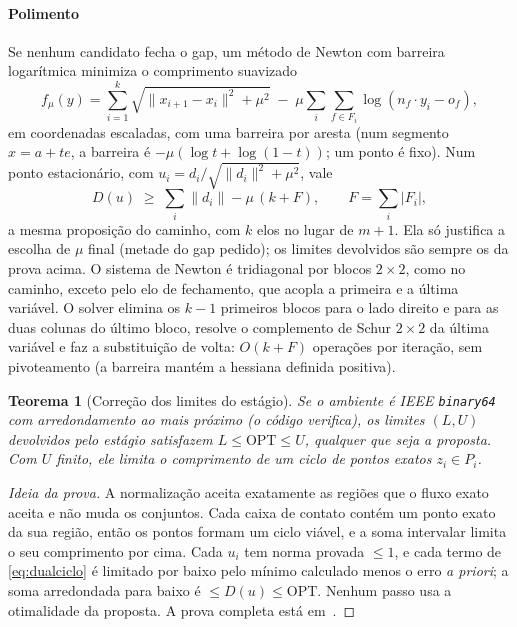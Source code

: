 \documentclass[11pt,a4paper]{article}
\theoremstyle{plain}\newtheorem{proposicao}{Proposição}
\theoremstyle{definition}\newtheorem{definicao}{Definição}
\theoremstyle{plain}\newtheorem{teorema}{Teorema}
\theoremstyle{plain}\newtheorem{lema}{Lema}
\newcommand{\norm}[1]{\lVert#1\rVert}
\newcommand{\abs}[1]{\lvert#1\rvert}
\newcommand{\OPT}{\mathrm{OPT}}
\begin{document}
\paragraph{Polimento} Se nenhum candidato fecha o gap, um método de Newton com barreira logarítmica minimiza o comprimento suavizado
\[
f_\mu(y)=\sum_{i=1}^k\sqrt{\norm{x_{i+1}-x_i}^2+\mu^2}\;-\;\mu\sum_i\sum_{f\in F_i}\log(n_f\cdot y_i-o_f),
\]
em coordenadas escaladas, com uma barreira por aresta (num segmento \(x=a+te\), a barreira é \(-\mu(\log t+\log(1-t))\); um ponto é fixo). Num ponto estacionário, com \(u_i=d_i/\sqrt{\norm{d_i}^2+\mu^2}\), vale
\begin{equation}\label{eq:perdabarreira}
D(u)\;\ge\;\sum_i\norm{d_i}-\mu\,(k+F),\qquad F=\textstyle\sum_i\abs{F_i},
\end{equation}
a mesma proposição do caminho, com \(k\) elos no lugar de \(m+1\). Ela só justifica a escolha de \(\mu\) final (metade do gap pedido); os limites devolvidos são sempre os da prova acima. O sistema de Newton é tridiagonal por blocos \(2\times2\), como no caminho, exceto pelo elo de fechamento, que acopla a primeira e a última variável. O solver elimina os \(k-1\) primeiros blocos para o lado direito e para as duas colunas do último bloco, resolve o complemento de Schur \(2\times2\) da última variável e faz a substituição de volta: \(O(k+F)\) operações por iteração, sem pivoteamento (a barreira mantém a hessiana definida positiva).

\begin{teorema}[Correção dos limites do estágio]\label{teo:binary64}
Se o ambiente é IEEE \texttt{binary64} com arredondamento ao mais próximo (o código verifica), os limites \((L,U)\) devolvidos pelo estágio satisfazem \(L\le\OPT\le U\), qualquer que seja a proposta. Com \(U\) finito, ele limita o comprimento de um ciclo de pontos exatos \(z_i\in P_i\).
\end{teorema}
\begin{proof}[Ideia da prova]
A normalização aceita exatamente as regiões que o fluxo exato aceita e não muda os conjuntos. Cada caixa de contato contém um ponto exato da sua região, então os pontos formam um ciclo viável, e a soma intervalar limita o seu comprimento por cima. Cada \(u_i\) tem norma provada \(\le1\), e cada termo de \eqref{eq:dualciclo} é limitado por baixo pelo mínimo calculado menos o erro \emph{a priori}; a soma arredondada para baixo é \(\le D(u)\le\OPT\). Nenhum passo usa a otimalidade da proposta. A prova completa está em~\cite{ciclo}.
\end{proof}
\end{document}

